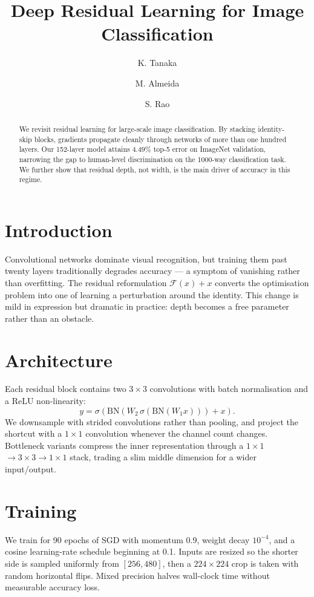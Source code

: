 \documentclass[11pt]{article}
\title{Deep Residual Learning for Image Classification}
\author{K. Tanaka \and M. Almeida \and S. Rao}
\date{}
\begin{document}
\maketitle

\begin{abstract}
We revisit residual learning for large-scale image classification. By stacking
identity-skip blocks, gradients propagate cleanly through networks of more than
one hundred layers. Our 152-layer model attains $4.49\%$ top-5 error on
ImageNet validation, narrowing the gap to human-level discrimination on the
1000-way classification task. We further show that residual depth, not width,
is the main driver of accuracy in this regime.
\end{abstract}

\section{Introduction}
Convolutional networks dominate visual recognition, but training them past
twenty layers traditionally degrades accuracy --- a symptom of vanishing rather
than overfitting. The residual reformulation $\mathcal{F}(x) + x$ converts the
optimisation problem into one of learning a perturbation around the identity.
This change is mild in expression but dramatic in practice: depth becomes a
free parameter rather than an obstacle.

\section{Architecture}
Each residual block contains two $3\times3$ convolutions with batch normalisation
and a ReLU non-linearity:
\begin{equation}
y = \sigma\!\left(\mathrm{BN}(W_2 \, \sigma(\mathrm{BN}(W_1 x))) + x\right).
\end{equation}
We downsample with strided convolutions rather than pooling, and project the
shortcut with a $1\times1$ convolution whenever the channel count changes.
Bottleneck variants compress the inner representation through a $1\times1$
$\to 3\times3 \to 1\times1$ stack, trading a slim middle dimension for a wider
input/output.

\section{Training}
We train for 90 epochs of SGD with momentum 0.9, weight decay $10^{-4}$, and a
cosine learning-rate schedule beginning at 0.1. Inputs are resized so the
shorter side is sampled uniformly from $[256, 480]$, then a $224\times224$
crop is taken with random horizontal flips. Mixed precision halves wall-clock
time without measurable accuracy loss.
\end{document}
